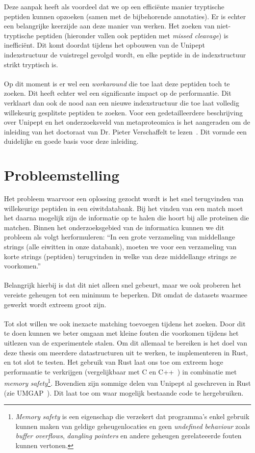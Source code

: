 Deze aanpak heeft als voordeel dat we op een efficiënte manier tryptische peptiden kunnen opzoeken (samen met de bijbehorende annotaties).
Er is echter een belangrijke keerzijde aan deze manier van werken.
Het zoeken van niet-tryptische peptiden (hieronder vallen ook peptiden met \textit{missed cleavage}) is inefficiënt.
Dit komt doordat tijdens het opbouwen van de Unipept indexstructuur de vuistregel gevolgd wordt, en elke peptide in de indexstructuur strikt tryptisch is.
\\ \\
Op dit moment is er wel een \textit{workaround} die toe laat deze peptiden toch te zoeken.
Dit heeft echter wel een significante impact op de performantie.
Dit verklaart dan ook de nood aan een nieuwe indexstructuur die toe laat volledig willekeurig gesplitste peptiden te zoeken.
\newline
Voor een gedetailleerdere beschrijving over Unipept en het onderzoeksveld van metaproteomica is het aangeraden om de inleiding van het doctoraat van Dr. Pieter Verschaffelt te lezen~\cite{phdPieterUnipept}.
Dit vormde een duidelijke en goede basis voor deze inleiding.


\section{Probleemstelling}\label{sec:probleemstelling}
Het probleem waarvoor een oplossing gezocht wordt is het snel terugvinden van willekeurige peptiden in een eiwitdatabank.
Bij het vinden van een match moet het daarna mogelijk zijn de informatie op te halen die hoort bij alle proteïnen die matchen.
Binnen het onderzoeksgebied van de informatica kunnen we dit probleem als volgt herformuleren:
``In een grote verzameling van middellange strings (alle eiwitten in onze databank), moeten we voor een verzameling van korte strings (peptiden) terugvinden in welke van deze middellange strings ze voorkomen.''
\\ \\
Belangrijk hierbij is dat dit niet alleen snel gebeurt, maar we ook proberen het vereiste geheugen tot een minimum te beperken.
Dit omdat de datasets waarmee gewerkt wordt extreem groot zijn.
\\ \\
Tot slot willen we ook inexacte matching toevoegen tijdens het zoeken.
Door dit te doen kunnen we beter omgaan met kleine fouten die voorkomen tijdens het uitlezen van de experimentele stalen.
Om dit allemaal te bereiken is het doel van deze thesis om meerdere datastructuren uit te werken, te implementeren in Rust, en tot slot te testen.
Het gebruik van Rust laat ons toe om extreem hoge performantie te verkrijgen (vergelijkbaar met C en C++~\cite{rustPerformantie}) in combinatie met \textit{memory safety}\footnote{\textit{Memory safety} is een eigenschap die verzekert dat programma's enkel gebruik kunnen maken van geldige geheugenlocaties en geen \textit{undefined behaviour} zoals \textit{buffer overflows}, \textit{dangling pointers} en andere geheugen gerelateeerde fouten kunnen vertonen.}.
Bovendien zijn sommige delen van Unipept al geschreven in Rust (zie UMGAP~\cite{UMGAP_paper, UMGAP_source}).
Dit laat toe om waar mogelijk bestaande code te hergebruiken.


